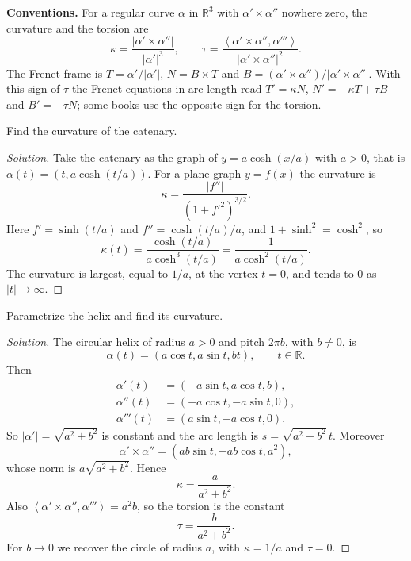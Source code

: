 \medskip\noindent
{\bf Conventions.}
For a regular curve $\alpha$ in
$\mathbb{R}^3$ with $\alpha' \times \alpha''$
nowhere zero, the curvature and the torsion
are
$$
\kappa =
\frac{|\alpha' \times \alpha''|}
{|\alpha'|^3},
\qquad
\tau =
\frac{\left\langle{} \alpha' \times \alpha'',
\alpha''' \right\rangle{}}
{|\alpha' \times \alpha''|^2}.
$$
The Frenet frame is $T = \alpha'/|\alpha'|$,
$N = B \times T$ and
$B = (\alpha' \times \alpha'') /
|\alpha' \times \alpha''|$.
With this sign of $\tau$ the Frenet
equations in arc length read $T' = \kappa N$,
$N' = -\kappa T + \tau B$ and
$B' = -\tau N$; some books use the
opposite sign for the torsion.

\begin{exercise}
\label{exercise-garcia-catenary}
Find the curvature of the catenary.
\end{exercise}

\begin{proof}[Solution]
Take the catenary as the graph of
$y = a\cosh(x/a)$ with $a > 0$, that is
$\alpha(t) = (t, a\cosh(t/a))$. For a plane
graph $y = f(x)$ the curvature is
$$
\kappa = \frac{|f''|}{(1 + f'^2)^{3/2}}.
$$
Here $f' = \sinh(t/a)$ and
$f'' = \cosh(t/a)/a$, and
$1 + \sinh^2 = \cosh^2$, so
$$
\kappa(t) =
\frac{\cosh(t/a)}{a \cosh^3(t/a)} =
\frac{1}{a \cosh^2(t/a)}.
$$
The curvature is largest, equal to $1/a$, at
the vertex $t = 0$, and tends to $0$ as
$|t| \to \infty$.
\end{proof}

\begin{exercise}
\label{exercise-garcia-helix}
Parametrize the helix and find its
curvature.
\end{exercise}

\begin{proof}[Solution]
The circular helix of radius $a > 0$ and
pitch $2\pi b$, with $b \neq 0$, is
$$
\alpha(t) = (a\cos t, a\sin t, bt),
\qquad t \in \mathbb{R}.
$$
Then
$$
\begin{aligned}
\alpha'(t) &= (-a\sin t, a\cos t, b), \\
\alpha''(t) &= (-a\cos t, -a\sin t, 0), \\
\alpha'''(t) &= (a\sin t, -a\cos t, 0).
\end{aligned}
$$
So $|\alpha'| = \sqrt{a^2 + b^2}$ is
constant and the arc length is
$s = \sqrt{a^2 + b^2}\, t$. Moreover
$$
\alpha' \times \alpha'' =
(ab\sin t, -ab\cos t, a^2),
$$
whose norm is $a\sqrt{a^2 + b^2}$. Hence
$$
\kappa = \frac{a}{a^2 + b^2}.
$$
Also
$\left\langle{} \alpha' \times \alpha'',
\alpha''' \right\rangle{} = a^2 b$, so the
torsion is the constant
$$
\tau = \frac{b}{a^2 + b^2}.
$$
For $b \to 0$ we recover the circle of
radius $a$, with $\kappa = 1/a$ and
$\tau = 0$.
\end{proof}


